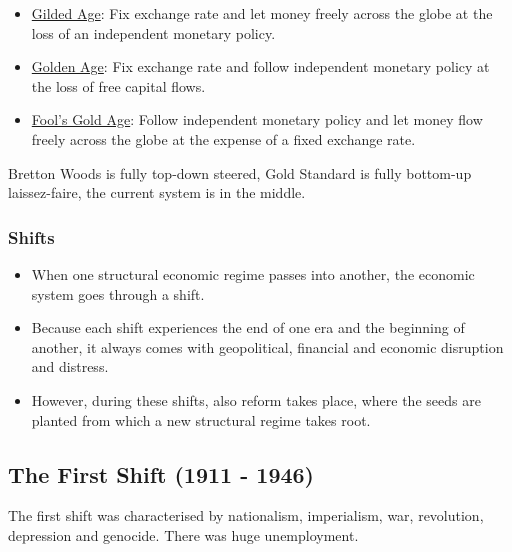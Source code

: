 \begin{itemize}
    \item \underline{Gilded Age}: Fix exchange rate and let money freely
        across the globe at the loss of an independent monetary policy.
    \item \underline{Golden Age}: Fix exchange rate and follow independent
        monetary policy at the loss of free capital flows.
    \item \underline{Fool's Gold Age}: Follow independent monetary policy and
        let money flow freely across the globe at the expense of a fixed
        exchange rate.
\end{itemize}

Bretton Woods is fully top-down steered, Gold Standard is fully bottom-up
laissez-faire, the current system is in the middle.

\subsubsection{Shifts}

\begin{itemize}
    \item When one structural economic regime passes into another, the economic
        system goes through a shift.
    \item Because each shift experiences the end of one era and the beginning
        of another, it always comes with geopolitical, financial and economic
        disruption and distress.
    \item However, during these shifts, also reform takes place, where the
        seeds are planted from which a new structural regime takes root.
\end{itemize}


\subsection{The First Shift (1911 - 1946)}

The first shift was characterised by nationalism, imperialism, war,
revolution, depression and genocide. There was huge unemployment.

\vspace{1\baselineskip}

